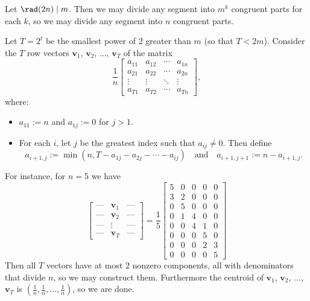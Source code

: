 Let $\rad(2n)\mid m$. Then we may divide any segment into $m^k$ congruent parts for each $k$, so we may divide any segment into $n$ congruent parts.

Let $T=2^t$ be the smallest power of $2$ greater than $m$ (so that $T<2m$). Consider the $T$ row vectors $\mathbf v_1$, $\mathbf v_2$, $\ldots$, $\mathbf v_T$ of the matrix
\[
    \frac1n\begin{bmatrix}
        a_{11}&a_{12}&\cdots&a_{1n}\\
        a_{21}&a_{22}&\cdots&a_{2n}\\
        \vdots&\vdots&\ddots&\vdots\\
        a_{T1}&a_{T2}&\cdots&a_{Tn}
    \end{bmatrix},
\]
where:
\begin{itemize}
    \item $a_{11}:=n$ and $a_{1j}:=0$ for $j>1$.
    \item For each $i$, let $j$ be the greatest index such that $a_{ij}\ne0$. Then define \[a_{i+1,j}:=\min(n,T-a_{1j}-a_{2j}-\cdots-a_{ij})\quad\text{and}\quad a_{i+1,j+1}:=n-a_{i+1,j}.\]
\end{itemize}

For instance, for $n=5$ we have
\[
    \begin{bmatrix}
        \textrm{---}&\mathbf v_1&\textrm{---}\\
        \textrm{---}&\mathbf v_2&\textrm{---}\\
        \textrm{---}&\vdots&\textrm{---}\\
        \textrm{---}&\mathbf v_T&\textrm{---}
    \end{bmatrix}
    =\frac15\begin{bmatrix}
        5&0&0&0&0\\
        3&2&0&0&0\\
        0&5&0&0&0\\
        0&1&4&0&0\\
        0&0&4&1&0\\
        0&0&0&5&0\\
        0&0&0&2&3\\
        0&0&0&0&5
    \end{bmatrix}
\]
Then all $T$ vectors have at most $2$ nonzero components, all with denominators that divide $n$, so we may construct them. Furthermore the centroid of $\mathbf v_1$, $\mathbf v_2$, $\ldots$, $\mathbf v_T$ is $(\tfrac1n,\tfrac1n,\ldots,\tfrac1n)$, so we are done.
